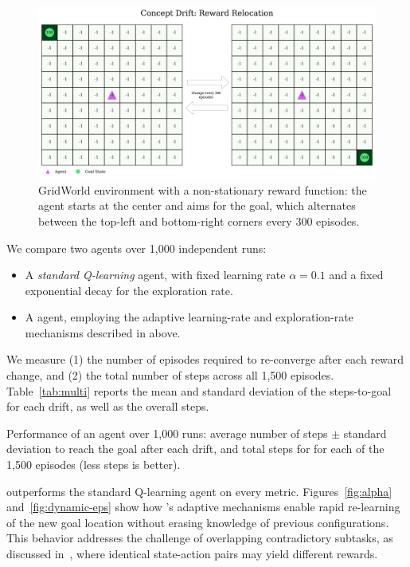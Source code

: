 \begin{figure}
    \centering
    \includegraphics[width=\textwidth]{figures/rewards_change.png}
    \caption{GridWorld environment with a non-stationary reward function: the agent starts at the center and aims for the goal, which alternates between the top-left and bottom-right corners every 300 episodes.}
    \label{fig:r-change}
\end{figure}

We compare two agents over 1,000 independent runs:  
\begin{itemize}
  \item A \emph{standard Q-learning} agent, with fixed learning rate $\alpha=0.1$ and a fixed exponential decay for the exploration rate.
  \item A \emph{\adaptiverl} agent, employing the adaptive learning-rate and exploration-rate mechanisms described in above.
\end{itemize}
We measure (1) the number of episodes required to re-converge after each reward change, and (2) the total number of steps across all 1,500 episodes. Table~\ref{tab:multi} reports the mean and standard deviation of the steps-to-goal for each drift, as well as the overall steps.  

\begin{table}
    \centering
    \caption{Performance of an agent over 1,000 runs: average number of steps $\pm$ standard deviation to reach the goal after each drift, and total steps for for each of the 1,500 episodes (less steps is better).}
    
    \label{tab:multi}
\end{table}

\adaptiverl outperforms the standard Q-learning agent on every metric. Figures~\ref{fig:alpha} and~\ref{fig:dynamic-eps} show how \adaptiverl's adaptive mechanisms enable rapid re-learning of the new goal location without erasing knowledge of previous configurations. This behavior addresses the challenge of overlapping contradictory subtasks, as discussed in~\cite{Bagus2022}, where identical state-action pairs may yield different rewards.

